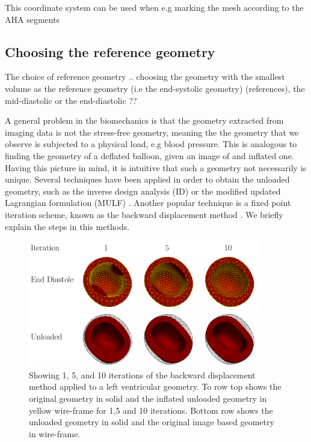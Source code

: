 This coordinate system can be used when e.g marking the mesh according
to the AHA segments

\subsection{Choosing the reference geometry}
\label{sef:reference_geometry}
The choice of reference geometry ..
 choosing the geometry with the smallest
volume as the reference geometry (i.e the end-systolic geometry)
(references), the mid-diastolic or the end-diastolic ??


A general problem in the biomechanics is that the geometry extracted from
imaging data is not the stress-free geometry, meaning the the geometry
that we observe is subjected to a physical load, e.g blood pressure.
This is analogous to finding the geometry of a deflated balloon, given
an image of and inflated one. Having this picture in mind, it is
intuitive that such a geometry not necessarily is unique.
Several techniques have been applied in order to obtain the unloaded
geometry, such as the inverse design analysis (ID)
\cite{govindjee1996computational} or the modified updated Lagrangian
formulation (MULF) \cite{gee2010computational}. Another popular
technique is a fixed point iteration scheme,  known as the
backward displacement method \cite{bols2013computational}. We briefly
explain the steps in this methods.

\begin{figure}[htbp]
  \centering
    \includegraphics[width=0.9\textwidth]{chapters/introduction/figures/unloading/canvas.pdf}
\caption{Showing 1, 5, and 10 iterations of the backward displacement
  method applied to a left ventricular geometry. To row top shows the
  original geometry in solid and the inflated unloaded geometry in
  yellow wire-frame for 1,5 and 10 iterations. Bottom row shows the
  unloaded geometry in solid and the original image based geometry in wire-frame.}
\label{fig:unloading_lv}
\end{figure}


